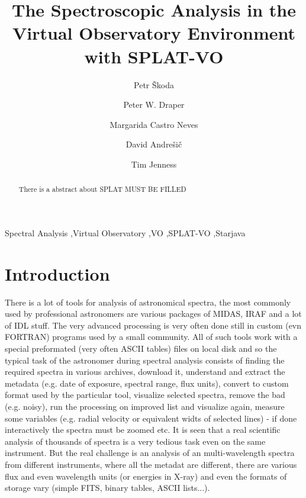 \documentclass[final,authoryear,5p,times,twocolumn]{elsarticle}
\begin{document}
\begin{frontmatter}

\title{The Spectroscopic Analysis in the Virtual Observatory Environment with SPLAT-VO}

\author[OND]{Petr \v{S}koda}
\author[DUR]{Peter W. Draper}
\author[HDB]{Margarida Castro Neves}
\author[VSB]{David Andre\v{s}i\v{c}}
\author[COR]{Tim Jenness}

\address[OND]{Astronomical Institute of the Academy of Sciences,Fri\v{c}ova~298, 251\,65, Ond\v{r}ejov, Czech Republic}
\address[DUR]{Department of Physics, Institute for Computational
Cosmology, University of Durham, South Road, Durham DH1 3LE, UK}
\address[HDB]{Universit\"a{}t Hyeidelberg, Astronomisches Rechen-Institut,
M\"o{}nchhofstra\ss{}e 12--14, 69120 Heidelberg, Germany}
\address[VSB]{Department of Computer Science, Faculty of Electrical
Engineering and Computer Science, V\v{S}B --- Technical University of Ostrava, 17. listopadu 15, 708 33 Ostrava-Poruba, Czech Republic}
\address[COR]{Department of Astronomy, Cornell University, Ithaca, NY 14853, USA}


\begin{abstract}
There is a abstract about SPLAT
MUST BE FILLED
\end{abstract}
\begin{keyword}
Spectral Analysis \sep Virtual Observatory \sep VO \sep SPLAT-VO \sep Starjava
\end{keyword}
\end{frontmatter}

\section{Introduction}

There is a lot of tools for analysis of astronomical spectra, the most commonly
used by professional astronomers are various packages of MIDAS, IRAF and a lot
of IDL stuff. The very advanced processing is very often done still in custom
(evn FORTRAN) programs used by a small community.  All of such tools work with
a special preformated (very often ASCII tables)  files on local disk and so the
typical task of the astronomer during spectral analysis consists of finding the
required spectra in various archives, download it, understand and extract the
metadata (e.g. date of exposure, spectral range, flux units),  convert to
custom format used by the particular tool, visualize selected spectra, remove
the bad (e.g. noisy), run the processing on improved list and visualize again,
measure some variables (e.g. radial velocity or equivalent widts of selected
lines) - if done interactively the spectra must be zoomed etc.  It is seen that
a real scientific analysis of thousands of spectra is a very tedious task even
on the same instrument. But the real challenge is an analysis of an
multi-wavelength spectra from different instruments, where all the metadat are
different, there are various flux and even wavelength units (or energies in
X-ray) and even the formats of storage vary (simple FITS, binary tables, ASCII
lists...).
\end{document}
